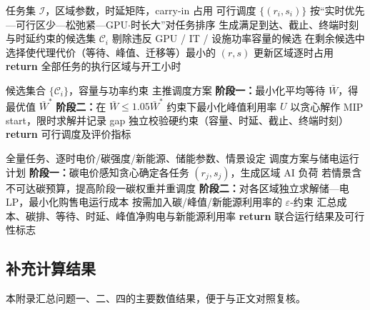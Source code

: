 \documentclass[UTF8,a4paper,zihao=-4]{ctexart}
\begin{document}
\begin{algorithm}[H]
\caption{问题一动态贪心可行调度}
\label{alg:q1-greedy}
\begin{algorithmic}[1]
\REQUIRE 任务集 $\mathcal{I}$，区域参数，时延矩阵，carry-in 占用
\ENSURE 可行调度 $\{(r_i,s_i)\}$
\STATE 按“实时优先—可行区少—松弛紧—GPU$\cdot$时长大”对任务排序
    \STATE 生成满足到达、截止、终端时刻与时延约束的候选集 $\mathcal{C}_i$
    \STATE 剔除违反 GPU / IT / 设施功率容量的候选
    \STATE 在剩余候选中选择使代理代价（等待、峰值、迁移等）最小的 $(r,s)$
    \STATE 更新区域逐时占用
\ENDFOR
\STATE \textbf{return} 全部任务的执行区域与开工小时
\end{algorithmic}
\end{algorithm}

\begin{algorithm}[H]
\caption{问题一字典序 MILP（等待优先，再削峰）}
\label{alg:q1-lex}
\begin{algorithmic}[1]
\REQUIRE 候选集合 $\{\mathcal{C}_i\}$，容量与功率约束
\ENSURE 主推调度方案
\STATE \textbf{阶段一：}最小化平均等待 $\bar{W}$，得最优值 $\bar{W}^\ast$
\STATE \textbf{阶段二：}在 $\bar{W}\le 1.05\bar{W}^\ast$ 约束下最小化峰值利用率 $U$
\STATE 以贪心解作 MIP start，限时求解并记录 gap
\STATE 独立校验硬约束（容量、时延、截止、终端时刻）
\STATE \textbf{return} 可行调度及评价指标
\end{algorithmic}
\end{algorithm}

\begin{algorithm}[H]
\caption{问题四两阶段算电协同}
\label{alg:q4-two-stage}
\begin{algorithmic}[1]
\REQUIRE 全量任务、逐时电价/碳强度/新能源、储能参数、情景设定
\ENSURE 调度方案与储电运行计划
\STATE \textbf{阶段一：}碳电价感知贪心确定各任务 $(r_j,s_j)$，生成区域 AI 负荷
\STATE 若情景含不可达碳预算，提高阶段一碳权重并重调度
\STATE \textbf{阶段二：}对各区域独立求解储—电 LP，最小化购售电运行成本
\STATE 按需加入碳/峰值/新能源利用率的 $\varepsilon$-约束
\STATE 汇总成本、碳排、等待、时延、峰值净购电与新能源利用率
\STATE \textbf{return} 联合运行结果及可行性标志
\end{algorithmic}
\end{algorithm}

\subsection{补充计算结果}

本附录汇总问题一、二、四的主要数值结果，便于与正文对照复核。
\end{document}
